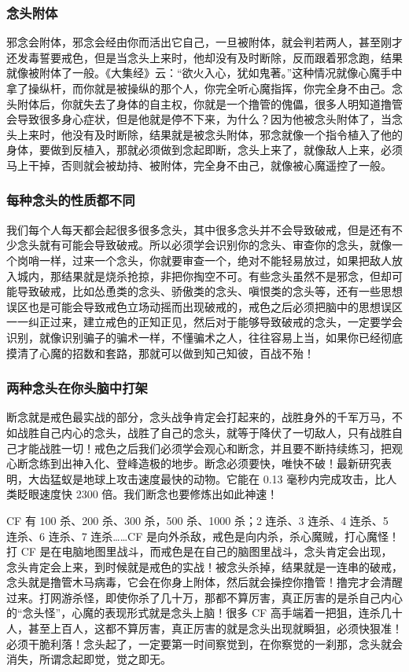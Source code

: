\subsubsection{念头附体}

邪念会附体，邪念会经由你而活出它自己，一旦被附体，就会判若两人，甚至刚才还发毒誓要戒色，但是当念头上来时，他却没有及时断除，反而跟着邪念跑，结果就像被附体了一般。《大集经》云：“欲火入心，犹如鬼著。”这种情况就像心魔手中拿了操纵杆，而你就是被操纵的那个人，你完全听心魔指挥，你完全身不由己。念头附体后，你就失去了身体的自主权，你就是一个撸管的傀儡，很多人明知道撸管会导致很多身心症状，但是他就是停不下来，为什么？因为他被念头附体了，当念头上来时，他没有及时断除，结果就是被念头附体，邪念就像一个指令植入了他的身体，要做到反植入，那就必须做到念起即断，念头上来了，就像敌人上来，必须马上干掉，否则就会被劫持、被附体，完全身不由己，就像被心魔遥控了一般。

\subsubsection{每种念头的性质都不同}

我们每个人每天都会起很多很多念头，其中很多念头并不会导致破戒，但是还有不少念头就有可能会导致破戒。所以必须学会识别你的念头、审查你的念头，就像一个岗哨一样，过来一个念头，你就要审查一个，绝对不能轻易放过，如果把敌人放入城内，那结果就是烧杀抢掠，非把你掏空不可。有些念头虽然不是邪念，但却可能导致破戒，比如怂恿类的念头、骄傲类的念头、嗔恨类的念头等，还有一些思想误区也是可能会导致戒色立场动摇而出现破戒的，戒色之后必须把脑中的思想误区一一纠正过来，建立戒色的正知正见，然后对于能够导致破戒的念头，一定要学会识别，就像识别骗子的骗术一样，不懂骗术之人，往往容易上当，如果你已经彻底摸清了心魔的招数和套路，那就可以做到知己知彼，百战不殆！

\subsubsection{两种念头在你头脑中打架}

断念就是戒色最实战的部分，念头战争肯定会打起来的，战胜身外的千军万马，不如战胜自己内心的念头，战胜了自己的念头，就等于降伏了一切敌人，只有战胜自己才能战胜一切！戒色之后我们必须学会观心和断念，并且要不断持续练习，把观心断念练到出神入化、登峰造极的地步。断念必须要快，唯快不破！最新研究表明，大齿猛蚁是地球上攻击速度最快的动物。它能在 0.13 毫秒内完成攻击，比人类眨眼速度快 2300 倍。我们断念也要修炼出如此神速！

CF 有 100 杀、200 杀、300 杀，500 杀、1000 杀；2 连杀、3 连杀、4 连杀、5 连杀、6 连杀、7 连杀……CF 是向外杀敌，戒色是向内杀，杀心魔贼，打心魔怪！打 CF 是在电脑地图里战斗，而戒色是在自己的脑图里战斗，念头肯定会出现，念头肯定会上来，到时候就是戒色的实战！被念头杀掉，结果就是一连串的破戒，念头就是撸管木马病毒，它会在你身上附体，然后就会操控你撸管！撸完才会清醒过来。打网游杀怪，即使你杀了几十万，那都不算厉害，真正厉害的是杀自己内心的“念头怪”，心魔的表现形式就是念头上脑！很多 CF 高手端着一把狙，连杀几十人，甚至上百人，这都不算厉害，真正厉害的就是念头出现就瞬狙，必须快狠准！必须干脆利落！念头起了，一定要第一时间察觉到，在你察觉的一刹那，念头就会消失，所谓念起即觉，觉之即无。

